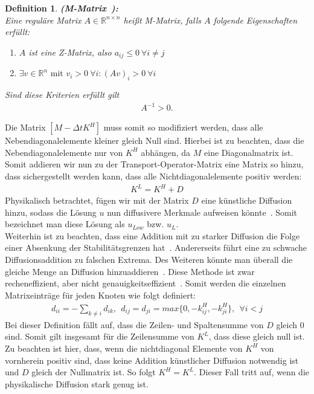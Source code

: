 \documentclass[a4paper,11pt]{article}
\newtheorem{defi}{Definition}[section]
\begin{document}
\begin{defi}\label{def:MMatrix}
 \textbf{(M-Matrix~\cite{fiedler2008special}):}\\
Eine reguläre Matrix $A\in \mathbb{R}^{n\times n}$ heißt M-Matrix, falls $A$ folgende Eigenschaften erfüllt:
\begin{enumerate}
 \item $A$ ist eine Z-Matrix, also $a_{ij}\le0~\forall i\neq j$
 \item $\exists v\in\mathbb{R}^n\text{ mit }v_i>0~\forall i:(Av)_i>0~\forall i$
\end{enumerate}
Sind diese Kriterien erfüllt gilt
\begin{align*}
 A^{-1}>0.
\end{align*}
\end{defi}
 Die Matrix $[M-\Delta tK^H]$ muss somit so modifiziert werden, dass alle Nebendiagonalelemente kleiner gleich Null sind. Hierbei ist zu beachten, dass die Nebendiagonalelemente nur von $K^H$ abhängen, da $M$ eine Diagonalmatrix ist. Somit addieren wir nun zu der Transport-Operator-Matrix eine Matrix so hinzu, dass sichergestellt werden kann, dass alle Nichtdiagonalelemente positiv werden:
\begin{align}
 K^L=K^H+D\label{eq:AddDif}
\end{align}
Physikalisch betrachtet, fügen wir mit der Matrix $D$ eine künstliche Diffusion hinzu, sodass die Lösung $u$ nun diffusivere Merkmale aufweisen könnte~\cite{kuzmin2002flux}. Somit bezeichnet man diese Lösung als $u_{Low}$ bzw. $u_L$.\\
Weiterhin ist zu beachten, dass eine Addition mit zu starker Diffusion die Folge einer Absenkung der Stabilitätsgrenzen hat~\cite{kuzmin2002flux}. Andererseits führt eine zu schwache Diffusionsaddition zu falschen Extrema. Des Weiteren könnte man überall die gleiche Menge an Diffusion hinzuaddieren~\cite{kuzmin2002flux}. Diese Methode ist zwar recheneffizient, aber nicht genauigkeitseffizient~\cite{kuzmin2002flux}. Somit werden die einzelnen Matrixeinträge für jeden Knoten wie folgt definiert:
\begin{align}
 d_{ii}=-\sum_{k\neq i}d_{ik},~~d_{ij}=d_{ji}=max\{0,-k_{ij}^H,-k_{ji}^H\},~~\forall i<j\label{eq:D}
\end{align}
Bei dieser Definition fällt auf, dass die Zeilen- und Spaltensumme von $D$ gleich 0 sind. Somit gilt insgesamt für die Zeilensumme von $K^L$, dass diese gleich null ist. Zu beachten ist hier, dass, wenn die nichtdiagonal Elemente von $K^H$ von vornherein positiv sind, dass keine Addition künstlicher Diffusion notwendig ist und $D$ gleich der Nullmatrix ist. So folgt $K^H=K^L$. Dieser Fall tritt auf, wenn die physikalische Diffusion stark genug ist.\\
\end{document}
